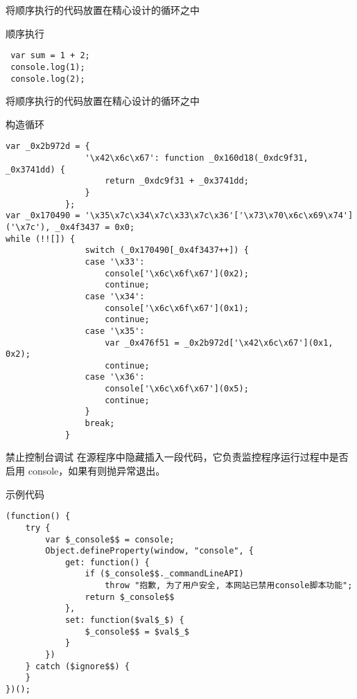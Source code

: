 \documentclass[presentation]{beamer}
\begin{document}
\begin{frame}[fragile,label=sec-14]{将顺序执行的代码放置在精心设计的循环之中}
\begin{block}{顺序执行}
\begin{verbatim}
 var sum = 1 + 2;
 console.log(1);
 console.log(2);
\end{verbatim}
\end{block}
\end{frame}
\begin{frame}[fragile,label=sec-15]{将顺序执行的代码放置在精心设计的循环之中}

\begin{block}{构造循环}
\begin{verbatim}
var _0x2b972d = {
                '\x42\x6c\x67': function _0x160d18(_0xdc9f31, _0x3741dd) {
                    return _0xdc9f31 + _0x3741dd;
                }
            };
var _0x170490 = '\x35\x7c\x34\x7c\x33\x7c\x36'['\x73\x70\x6c\x69\x74']('\x7c'), _0x4f3437 = 0x0;
while (!![]) {
                switch (_0x170490[_0x4f3437++]) {
                case '\x33':
                    console['\x6c\x6f\x67'](0x2);
                    continue;
                case '\x34':
                    console['\x6c\x6f\x67'](0x1);
                    continue;
                case '\x35':
                    var _0x476f51 = _0x2b972d['\x42\x6c\x67'](0x1, 0x2);
                    continue;
                case '\x36':
                    console['\x6c\x6f\x67'](0x5);
                    continue;
                }
                break;
            }
            \end{verbatim}
\end{block}
\end{frame}
\begin{frame}[fragile,label=sec-16]{禁止控制台调试}
在源程序中隐藏插入一段代码，它负责监控程序运行过程中是否启用 console，如果有则抛异常退出。
\begin{block}{示例代码}
\begin{verbatim}
(function() {  
    try {  
        var $_console$$ = console;  
        Object.defineProperty(window, "console", {  
            get: function() {  
                if ($_console$$._commandLineAPI)  
                    throw "抱歉, 为了用户安全, 本网站已禁用console脚本功能";  
                return $_console$$  
            },  
            set: function($val$_$) {  
                $_console$$ = $val$_$  
            }  
        })  
    } catch ($ignore$$) {  
    }  
})();  
\end{verbatim}
\end{block}
\end{frame}
\end{document}
